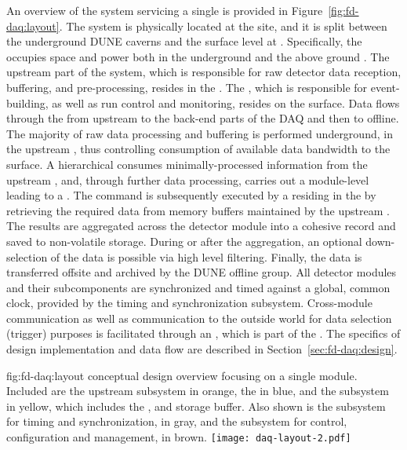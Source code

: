 An overview of the    system 
servicing a single 
 is
provided in Figure~\ref{fig:fd-daq:layout}. The system is
physically located at the  site, and it is split between the
underground DUNE caverns and the surface level at . Specifically, the  occupies space and
power both in the underground  and the above ground .
The upstream part of the system, which is responsible for
raw detector data reception, buffering, and pre-processing, resides in the .
The ,
which is responsible for
event-building, as well as run control and monitoring, resides on the
surface.
Data flows through the  from 
upstream to the back-end parts of the DAQ and then to offline. The majority
of raw data processing and buffering is performed underground, in the
upstream , thus controlling consumption of available data bandwidth  to the surface. A
hierarchical  consumes minimally-processed
information from the upstream , and, through further data processing, 
carries out a module-level  leading to a .
The command is subsequently executed by a  residing in the 
by retrieving the required data from memory buffers maintained by the upstream .
The results are aggregated across the detector module into a cohesive record and saved to non-volatile storage.
During or after the aggregation, an optional down-selection of the data is possible via
high level filtering.
Finally, the data is  transferred offsite and archived by the DUNE offline group.
All
detector modules and their subcomponents are synchronized and timed against a global,
common clock, provided by the timing and synchronization
subsystem. Cross-module communication as well as communication
to the outside world for data selection (trigger) purposes is facilitated
through an , which is part of the . The
specifics of design implementation and data flow are described in Section~\ref{sec:fd-daq:design}.

\begin{dunefigure}{fig:fd-daq:layout}{ conceptual design overview focusing
    on a single \nominalmodsize module. Included are the upstream
     subsystem in orange, the  in
    blue, and the  subsystem in yellow,
    which includes the ,  and storage buffer. 
    Also shown is the subsystem for timing and
    synchronization, in gray, and the subsystem for control,
    configuration and management, in brown.
  }
  \texttt{[image: daq-layout-2.pdf]}
\end{dunefigure}



